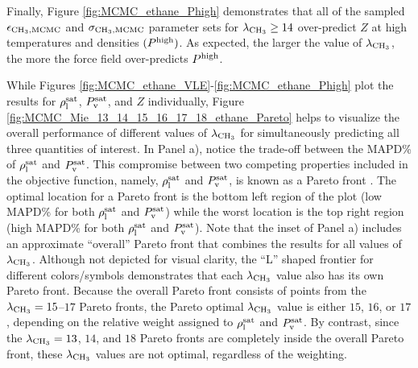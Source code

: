 \documentclass[preprint,letterpaper,floatfix,citeautoscript,aip,jcp]{revtex4-1}
\begin{document}
Finally, Figure \ref{fig:MCMC_ethane_Phigh} demonstrates that all of the sampled $\epsilon_{\rm CH_3, MCMC}$ and $\sigma_{\rm CH_3, MCMC}$ parameter sets for $\lambda_{\rm CH_3} \ge 14$ over-predict $Z$ at high temperatures and densities $(P^{\rm high})$. As expected, the larger the value of $\lambda_{\rm CH_3}$, the 
more 
the force field over-predicts $P^{\rm high}$.

While Figures \ref{fig:MCMC_ethane_VLE}-\ref{fig:MCMC_ethane_Phigh} plot the results for $\rho_{\rm l}^{\rm sat}$, $P_{\rm v}^{\rm sat}$, and $Z$ individually, Figure \ref{fig:MCMC_Mie_13_14_15_16_17_18_ethane_Pareto} helps to visualize the overall performance of different values of $\lambda_{\rm CH_3}$ for simultaneously predicting all three quantities of interest. 
In Panel a), notice the trade-off between the MAPD\% of $\rho_{\rm l}^{\rm sat}$ and $P_{\rm v}^{\rm sat}$. This compromise between two competing properties included in the objective function, namely, $\rho_{\rm l}^{\rm sat}$ and $P_{\rm v}^{\rm sat}$, is known as a Pareto front \cite{Pareto_Deriv,Pareto_LJPQ,Pareto_ST}. The optimal location for a Pareto front is the bottom left region of the plot (low MAPD\% for both $\rho_{\rm l}^{\rm sat}$ and $P_{\rm v}^{\rm sat}$) while the worst location is the top right region (high MAPD\% for both $\rho_{\rm l}^{\rm sat}$ and $P_{\rm v}^{\rm sat}$). Note that the inset of Panel a) includes an approximate ``overall'' Pareto front that combines the results for all values of $\lambda_{\rm CH_3}$. Although not depicted for visual clarity, the ``L'' shaped frontier for different colors/symbols demonstrates that each $\lambda_{\rm CH_3}$ value also has its own Pareto front. Because the overall Pareto front consists of points from the $\lambda_{\rm CH_3} = 15$--$17$ Pareto fronts, the Pareto optimal $\lambda_{\rm CH_3}$ value is either $15$, $16$, or $17$, depending on the relative weight assigned to $\rho_{\rm l}^{\rm sat}$ and $P_{\rm v}^{\rm sat}$. By contrast, since the $\lambda_{\rm CH_3} = 13$, $14$, and $18$ Pareto fronts are completely inside the overall Pareto front, these $\lambda_{\rm CH_3}$ values are not optimal, regardless of the weighting.
\end{document}
